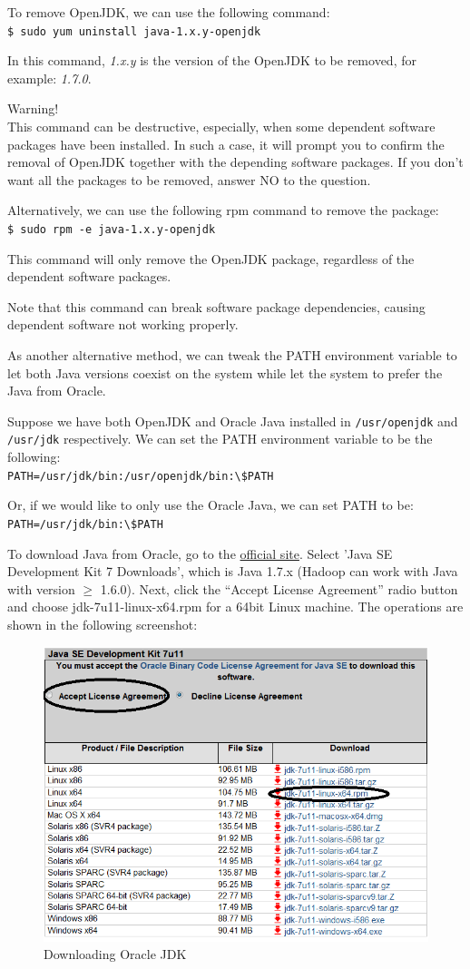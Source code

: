 To remove OpenJDK, we can use the following command: \\
\verb|$ sudo yum uninstall java-1.x.y-openjdk|

In this command, \emph{1.x.y} is the version of the OpenJDK to be removed, for example: \emph{1.7.0}.

\begin{warning}
Warning! \\
This command can be destructive, especially, when some dependent software packages have been installed. In such a case, it will prompt you to confirm the removal of OpenJDK together with the depending software packages. If you don't want all the packages to be removed, answer NO to the question.
\end{warning}

Alternatively, we can use the following rpm command to remove the package:\\
\verb|$ sudo rpm -e java-1.x.y-openjdk|

This command will only remove the OpenJDK package, regardless of the dependent software packages.

Note that this command can break software package dependencies, causing dependent software not working properly.

As another alternative method, we can tweak the PATH environment variable to let both Java versions coexist on the system while let the system to prefer the Java from Oracle.

Suppose we have both OpenJDK and Oracle Java installed in \verb|/usr/openjdk| and \verb|/usr/jdk| respectively. We can set the PATH environment variable to be the following: \\
\verb|PATH=/usr/jdk/bin:/usr/openjdk/bin:\$PATH|

Or, if we would like to only use the Oracle Java, we can set PATH to be: \\
\verb|PATH=/usr/jdk/bin:\$PATH|

To download Java from Oracle, go to the \href{http://www.oracle.com/technetwork/java/javase/downloads/index.html}{official site}. Select 'Java SE Development Kit 7 Downloads', which is Java 1.7.x (Hadoop can work with Java with version $\ge$ 1.6.0). Next, click the ``Accept License Agreement'' radio button and choose jdk-7u11-linux-x64.rpm for a 64bit Linux machine. The operations are shown in the following screenshot:
\begin{figure}[h]
  \centering
  \includegraphics[width=.6\textwidth]{figs/5163os_02_04.png}
  \caption{Downloading Oracle JDK}\label{fig:oracle.jdk}
\end{figure} 
